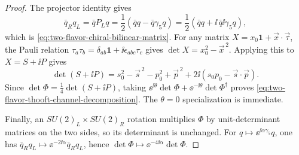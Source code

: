 \begin{proof}
The projector identity gives
\[
  \bar q_Rq_L=\bar qP_Lq
  =\frac12(\bar qq-\bar q\gamma_5q)
  =\frac12(\bar qq+\ii\,\bar q\ii\gamma_5q),
\]
which is \eqref{eq:two-flavor-chiral-bilinear-matrix}.  For any matrix
\(X=x_0\mathbf 1+\vec x\cdot\vec\tau\), the Pauli relation
\(\tau_a\tau_b=\delta_{ab}\mathbf 1+\ii\epsilon_{abc}\tau_c\) gives
\(\det X=x_0^2-\vec x^{\,2}\).  Applying this to
\(X=S+\ii P\) gives
\[
  \det(S+\ii P)
  =
  s_0^2-\vec s^{\,2}-p_0^2+\vec p^{\,2}
  +2\ii(s_0p_0-\vec s\cdot\vec p).
\]
Since \(\det\Phi=\frac14\det(S+\ii P)\), taking
\(\ee^{\ii\theta}\det\Phi+\ee^{-\ii\theta}\det\Phi^\dagger\) proves
\eqref{eq:two-flavor-thooft-channel-decomposition}.  The
\(\theta=0\) specialization is immediate.

Finally, an \(SU(2)_L\times SU(2)_R\) rotation multiplies \(\Phi\) by
unit-determinant matrices on the two sides, so its determinant is unchanged.
For \(q\mapsto\ee^{\ii\alpha\gamma_5}q\), one has
\(\bar q_Rq_L\mapsto\ee^{-2\ii\alpha}\bar q_Rq_L\), hence
\(\det\Phi\mapsto\ee^{-4\ii\alpha}\det\Phi\).
\end{proof}

